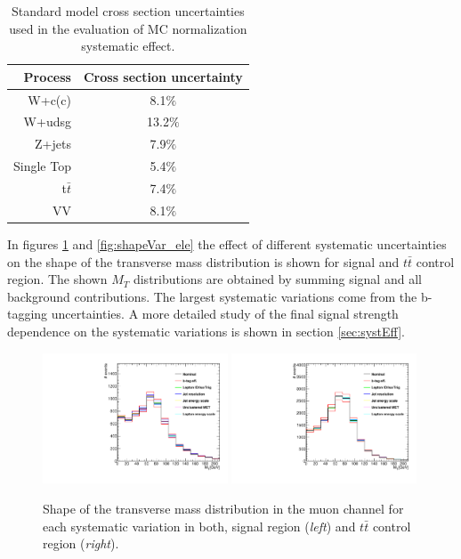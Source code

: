\begin{table}[!htb]
\begin{center}
   \begin{tabular} {r c} \hline \hline
        Process         & Cross section uncertainty \\
        \hline
        W+c(c)          & 8.1$\%$ \\
        W+udsg          & 13.2$\%$ \\
        Z+jets          & 7.9$\%$ \\
        Single Top      & 5.4$\%$ \\
        t$\bar{t}$      & 7.4$\%$ \\
        VV              & 8.1$\%$ \\
        \hline\hline
   \end{tabular}
\caption{Standard model cross section uncertainties used in the evaluation of MC normalization systematic effect.}
\label{tab:SMunc}
\end{center}
\end{table}

In figures \ref{fig:shapeVar} and \ref{fig:shapeVar_ele} the effect of different systematic uncertainties on the shape of the transverse mass distribution is shown for signal and $t\bar{t}$ control region. The shown $M_T$ distributions are obtained by summing signal and all background contributions. The largest systematic variations come from the b-tagging uncertainties. A more detailed study of the final signal strength dependence on the systematic variations is shown in section \ref{sec:systEff}.

\begin{figure}[htbp]
	\centering
		\includegraphics[width=0.49\textwidth]{Figures/Results/Muon/systPlots/syst_Wbb_GetVMt.pdf}
		\includegraphics[width=0.49\textwidth]{Figures/Results/Muon/systPlots/syst_TT_GetVMt.pdf}
	\caption[Shape of the transverse mass distribution for each systematic variation in both, signal region and $t\bar{t}$ control region.]{Shape of the transverse mass distribution in the muon channel for each systematic variation in both, signal region (\textit{left}) and $t\bar{t}$ control region (\textit{right}).}
	\label{fig:shapeVar}
\end{figure}

